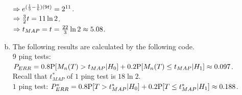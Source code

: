 \begin{pr}
\begin{enumerate}[(a)]
$\then e^{(\frac13-\frac16)(9t)}=2^{11}$.\\
$\then\frac32t=11\ln2$.\\
$\then t_{MAP}=t=\frac{22}3\ln2\approx5.08$.
\item The following results are calculated by the following code.\\
$9$ ping tests: $P_{ERR}=0.8\P[\M>t_{MAP}|H_0]+0.2\P[\M\leq t_{MAP}|H_1]\approx0.097$.\\
Recall that $t_{MAP}^*$ of $1$ ping test is $18\ln2$.\\
$1$ ping test: $P_{ERR}^*=0.8\P[T>t_{MAP}^*|H_0]+0.2\P[T\leq t_{MAP}^*|H_1]\approx0.188$.
\end{enumerate}
\end{pr}
